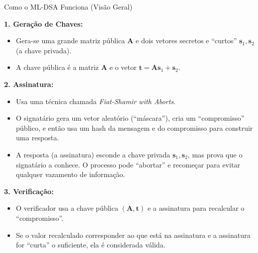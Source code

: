 \documentclass{beamer}
\begin{document}
\begin{frame}{Como o ML-DSA Funciona (Visão Geral)}

    \textbf{1. Geração de Chaves:}
    \begin{itemize}
        \small
        \item Gera-se uma grande matriz pública $\mathbf{A}$ e dois vetores secretos e ``curtos'' $\mathbf{s}_1, \mathbf{s}_2$ (a chave privada).
        \item A chave pública é a matriz $\mathbf{A}$ e o vetor $\mathbf{t} = \mathbf{A}\mathbf{s}_1 + \mathbf{s}_2$.
    \end{itemize}
    \pause
    
    \textbf{2. Assinatura:}
    \begin{itemize}
        \small
        \item Usa uma técnica chamada \textit{Fiat-Shamir with Aborts}.
        \item O signatário gera um vetor aleatório (``máscara''), cria um ``compromisso'' público, e então usa um hash da mensagem e do compromisso para construir uma resposta.
        \item A resposta (a assinatura) esconde a chave privada $\mathbf{s}_1, \mathbf{s}_2$, mas prova que o signatário a conhece. O processo pode ``abortar'' e recomeçar para evitar qualquer vazamento de informação.
    \end{itemize}
    \pause

    \textbf{3. Verificação:}
    \begin{itemize}
        \small
        \item O verificador usa a chave pública $(\mathbf{A}, \mathbf{t})$ e a assinatura para recalcular o ``compromisso''.
        \item Se o valor recalculado corresponder ao que está na assinatura e a assinatura for ``curta'' o suficiente, ela é considerada válida.
    \end{itemize}
\end{frame}
\end{document}
